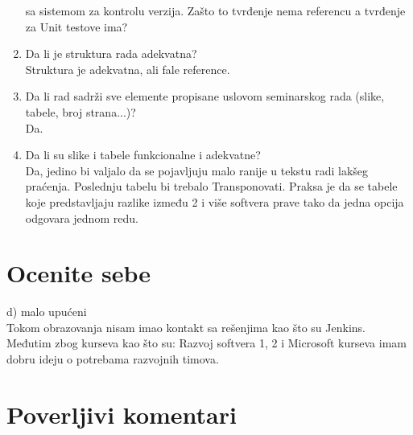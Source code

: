 \documentclass[a4paper]{article}
\begin{document}
\begin{enumerate}
  sa sistemom za kontrolu verzija. Zašto to tvrđenje nema referencu a tvrđenje za Unit testove ima?
\item Da li je struktura rada adekvatna?\\
  Struktura je adekvatna, ali fale reference.
\item Da li rad sadrži sve elemente propisane uslovom seminarskog rada (slike, tabele, broj strana...)?\\
  Da.
\item Da li su slike i tabele funkcionalne i adekvatne?\\
  Da, jedino bi valjalo da se pojavljuju malo ranije u tekstu radi lakšeg praćenja.
  Poslednju tabelu bi trebalo Transponovati. Praksa je da se tabele koje predstavljaju
  razlike između 2 i više softvera prave tako da jedna opcija odgovara jednom redu.
\end{enumerate}



\section{Ocenite sebe}
d) malo upućeni \\
Tokom obrazovanja nisam imao kontakt sa rešenjima kao što su Jenkins.
Međutim zbog kurseva kao što su: Razvoj softvera 1, 2 i Microsoft kurseva imam 
dobru ideju o potrebama razvojnih timova.

\section{Poverljivi komentari}
\end{document}
